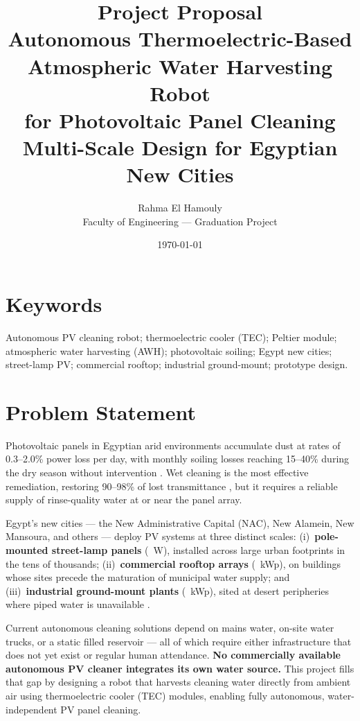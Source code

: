 \documentclass[11pt,a4paper]{article}
\title{\textbf{Project Proposal}\\[0.35em]
\large Autonomous Thermoelectric-Based Atmospheric Water Harvesting Robot\\
for Photovoltaic Panel Cleaning\\[0.25em]
\normalsize Multi-Scale Design for Egyptian New Cities}
\author{Rahma El Hamouly\\Faculty of Engineering --- Graduation Project}
\date{\today}
\begin{document}
\maketitle

\section*{Keywords}
Autonomous PV cleaning robot; thermoelectric cooler (TEC); Peltier module; atmospheric water
harvesting (AWH); photovoltaic soiling; Egypt new cities; street-lamp PV; commercial rooftop;
industrial ground-mount; prototype design.

\section{Problem Statement}

Photovoltaic panels in Egyptian arid environments accumulate dust at rates of 0.3--2.0\% power
loss per day, with monthly soiling losses reaching 15--40\% during the dry season without
intervention \cite{kazem2023soiling,sarver2013pvsoiling}. Wet cleaning is the most effective
remediation, restoring 90--98\% of lost transmittance \cite{mejia2021cleaning}, but it requires
a reliable supply of rinse-quality water at or near the panel array.

Egypt's new cities --- the New Administrative Capital (NAC), New Alamein, New Mansoura, and
others --- deploy PV systems at three distinct scales: (i)~\textbf{pole-mounted street-lamp
panels} (\ScaleAPV~W), installed across large urban footprints in the tens of thousands;
(ii)~\textbf{commercial rooftop arrays} (\ScaleBPV~kWp), on buildings whose sites precede
the maturation of municipal water supply; and (iii)~\textbf{industrial ground-mount plants}
(\ScaleCPV~kWp), sited at desert peripheries where piped water is unavailable
\cite{egypt2030vision,irena2023egypt}.

Current autonomous cleaning solutions depend on mains water, on-site water trucks, or a static
filled reservoir --- all of which require either infrastructure that does not yet exist or
regular human attendance. \textbf{No commercially available autonomous PV cleaner integrates
its own water source.} This project fills that gap by designing a robot that harvests cleaning
water directly from ambient air using thermoelectric cooler (TEC) modules, enabling fully
autonomous, water-independent PV panel cleaning.
\end{document}
